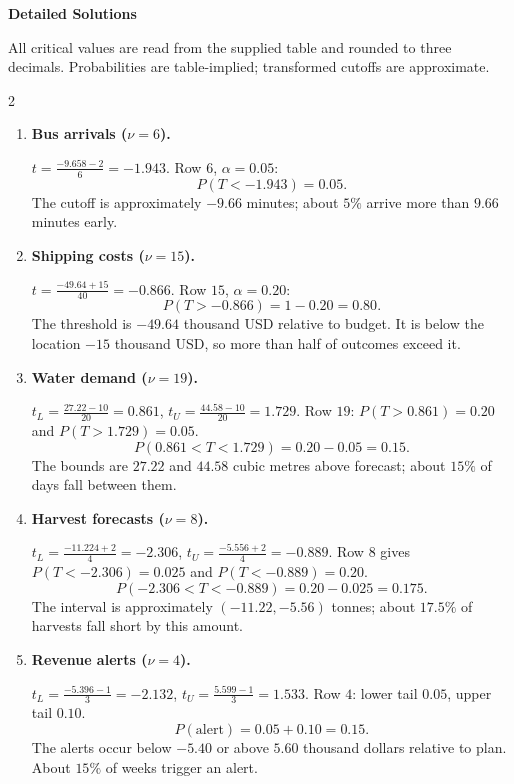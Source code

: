 	\newpage
	\begin{center}{\large\bfseries Detailed Solutions}\end{center}
	\small\linespread{1}\selectfont
	\setlength{\abovedisplayskip}{2pt}\setlength{\belowdisplayskip}{2pt}
	\setlength{\jot}{1pt}
	All critical values are read from the supplied table and rounded to three decimals. Probabilities are table-implied; transformed cutoffs are approximate.
	\begin{multicols}{2}
		\begin{enumerate}[leftmargin=*,itemsep=5pt,parsep=1pt,topsep=2pt]
			\item \textbf{Bus arrivals ($\nu=6$).}
			\par $t=\frac{-9.658-2}{6}=-1.943$. Row $6$, $\alpha=0.05$:
			\[P(T<-1.943)=\boxed{0.05}.\]
			The cutoff is approximately $-9.66$ minutes; about $5\%$ arrive more than $9.66$ minutes early.
			
			\item \textbf{Shipping costs ($\nu=15$).}
			\par $t=\frac{-49.64+15}{40}=-0.866$. Row $15$, $\alpha=0.20$:
			\[P(T>-0.866)=1-0.20=\boxed{0.80}.\]
			The threshold is $-49.64$ thousand USD relative to budget. It is below the location $-15$ thousand USD, so more than half of outcomes exceed it.
			
			\item \textbf{Water demand ($\nu=19$).}
			\par $t_L=\frac{27.22-10}{20}=0.861$, $t_U=\frac{44.58-10}{20}=1.729$. Row $19$: $P(T>0.861)=0.20$ and $P(T>1.729)=0.05$.
			\[P(0.861<T<1.729)=0.20-0.05=\boxed{0.15}.\]
			The bounds are $27.22$ and $44.58$ cubic metres above forecast; about $15\%$ of days fall between them.
			
			\item \textbf{Harvest forecasts ($\nu=8$).}
			\par $t_L=\frac{-11.224+2}{4}=-2.306$, $t_U=\frac{-5.556+2}{4}=-0.889$. Row $8$ gives $P(T<-2.306)=0.025$ and $P(T<-0.889)=0.20$.
			\[P(-2.306<T<-0.889)=0.20-0.025=\boxed{0.175}.\]
			The interval is approximately $(-11.22,-5.56)$ tonnes; about $17.5\%$ of harvests fall short by this amount.
			
			\item \textbf{Revenue alerts ($\nu=4$).}
			\par $t_L=\frac{-5.396-1}{3}=-2.132$, $t_U=\frac{5.599-1}{3}=1.533$. Row $4$: lower tail $0.05$, upper tail $0.10$.
			\[P(\text{alert})=0.05+0.10=\boxed{0.15}.\]
			The alerts occur below $-5.40$ or above $5.60$ thousand dollars relative to plan. About $15\%$ of weeks trigger an alert.
			

\end{enumerate}
\end{multicols}
